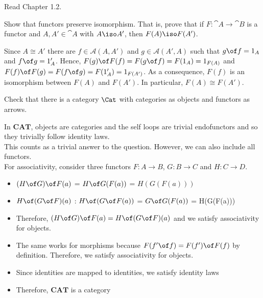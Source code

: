 \def\pathToRoot{../../}

\newcommand{\A}{\cat A}
\newcommand{\B}{\cat B}
\newcommand{\M}{\cat M}
\newcommand{\Rel}{\fcat{Rel}}

\newcommand{\const}[1]{\mathsf{const}_{#1}}




\author{Mostafa Ahmed Abdelfattah Abouhamra, Felix Rech, Dominik Wagner}

\begin{hint}
  Read Chapter 1.2.
\end{hint}

\begin{exercise}
Show that functors preserve isomorphism. That is, prove that if $F : \cat{A} \to \cat{B}$ is a functor and $A, A' \in \cat{A}$ with $A \iso A'$, then $F(A) \iso F(A')$.
\end{exercise}

\begin{answer}
  Since $A\cong A'$ there are $f\in\mathscr A(A,A')$ and $g\in\mathscr A(A',A)$ such that $g \of f=1_A$ and $f \of g=1_A'$. Hence, $F(g)\of F(f)=F(g\of f)=F(1_A)=1_{F(A)}$ and $F(f)\of F(g)=F(f\of g)=F(1_A')=1_{F(A')}$. As a consequence, $F(f)$ is an isomorphism between $F(A)$ and $F(A')$. In particular, $F(A)\cong F(A')$.
\end{answer}

\begin{exercise}
  Check that there is a category $\Cat$ with categories as objects and functors as arrows.
\end{exercise}

\begin{answer}
In $\mathbf{CAT}$, objects are categories and the self loops are trivial endofunctors and so they trivially follow identity laws.\\
This counts as a trivial answer to the question. However, we can also include all functors.\\
For associativity, consider three functors $F:A\rightarrow B$, $G:B\rightarrow C$ and $H:C\rightarrow D$.\\
\begin{itemize}
\item $(H \of G) \of F(a)$ = $H \of G(F(a))$ = $H(G(F(a)))$
\item $H \of (G \of F) (a)$ : $H \of (G \of F(a))$ = $G \of G(F(a))$ = H(G(F(a)))
\item Therefore, $(H \of G) \of F(a) = H \of (G \of F) (a)$ and we satisfy associativity for objects.
\item The same works for morphisms because $F(f' \of f)  = F(f') \of F(f)$ by definition. Therefore, we satisfy associativity for objects.
\item Since identities are mapped to identities, we satisfy identity laws
\item Therefore, $\mathbf{CAT}$ is a category
\end{itemize}
\end{answer}

